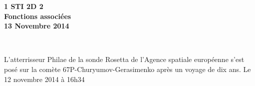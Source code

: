 \documentclass[11pt]{article}
\begin{document}

\begin{minipage}[t]{\textwidth}
  \raggedright
      {\bfseries 1 STI 2D 2}\\[.35ex]
      \vspace*{-1cm}
      \raggedleft
          {\bfseries Fonctions associées}\\[.35ex]
          {\bfseries 13 Novembre 2014}\\[.35ex]
\end{minipage}\\[1em]

\begin{center}
  \textsf{L'atterrisseur Philae de la sonde Rosetta de l'Agence spatiale européenne s'est posé sur la comète 67P-Churyumov-Gerasimenko après un voyage de dix ans. Le 12 novembre 2014 à 16h34}
\end{center}
\end{document}
